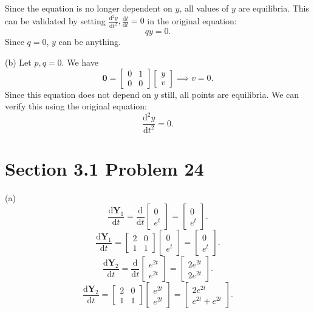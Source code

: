 \documentclass[11pt, letterpaper]{report}
\begin{document}
Since the equation is no longer dependent on $y$, all values of $y$ are equilibria. This can be validated by setting $\frac{\mathrm{d}^2y}{\mathrm{d}t^2} ,\frac{\mathrm{d}t}{\mathrm{d}t} =0$ in the original equation:
\[
	qy=0
.\]
Since $q=0$, $y$ can be anything.

(b) Let $p,q=0$. We have
\[
	\mathbf{0}=\begin{bmatrix} 0&1 \\ 0&0 \end{bmatrix} \begin{bmatrix} y \\ v \end{bmatrix} \implies v=0
.\]
Since this equation does not depend on $y$ still, all points are equilibria. We can verify this using the original equation:
\[
	\frac{\mathrm{d}^2y}{\mathrm{d}t^2} =0
.\]
\section*{Section 3.1 Problem 24}
(a)
\[
	\frac{\mathrm{d}\mathbf{Y}_1}{\mathrm{d}t} =\frac{\mathrm{d}}{\mathrm{d}t} \begin{bmatrix} 0 \\ e^t \end{bmatrix} =\begin{bmatrix} 0 \\ e^t \end{bmatrix} 
.\]
\[
	\frac{\mathrm{d}\mathbf{Y}_1}{\mathrm{d}t} =\begin{bmatrix} 2&0 \\ 1&1 \end{bmatrix} \begin{bmatrix} 0 \\ e^t \end{bmatrix} =\begin{bmatrix} 0 \\ e^t \end{bmatrix} 
.\]
\[
	\frac{\mathrm{d}\mathbf{Y}_2}{\mathrm{d}t} =\frac{\mathrm{d}}{\mathrm{d}t} \begin{bmatrix} e^{2t} \\ e^{2t} \end{bmatrix} =\begin{bmatrix} 2e^{2t} \\ 2e^{2t} \end{bmatrix} 
.\]
\[
	\frac{\mathrm{d}\mathbf{Y}_2}{\mathrm{d}t} =\begin{bmatrix} 2&0 \\ 1&1 \end{bmatrix} \begin{bmatrix} e^{2t} \\ e^{2t} \end{bmatrix} =\begin{bmatrix} 2e^{2t} \\ e^{2t}+e^{2t} \end{bmatrix} 
.\]
\end{document}
